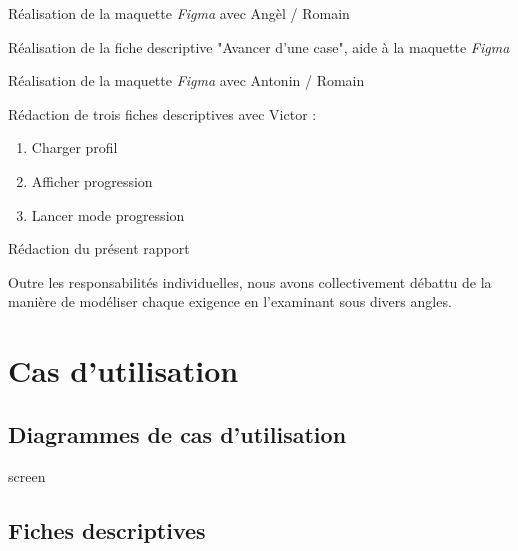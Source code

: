 \documentclass{butexFR}
\begin{document}

Réalisation de la maquette \textit{Figma} avec Angèl / Romain


Réalisation de la fiche descriptive "Avancer d'une case", aide à la maquette \textit{Figma}


Réalisation de la maquette \textit{Figma} avec Antonin / Romain


Rédaction de trois fiches descriptives avec Victor :
\begin{enumerate}
    \item Charger profil
    \item Afficher progression
    \item Lancer mode progression
\end{enumerate}

Rédaction du présent rapport


Outre les responsabilités individuelles, nous avons collectivement débattu de la manière de modéliser chaque exigence en l'examinant sous divers angles.

\section{Cas d'utilisation}

\subsection{Diagrammes de cas d'utilisation}

screen

\subsection{Fiches descriptives}
\end{document}
